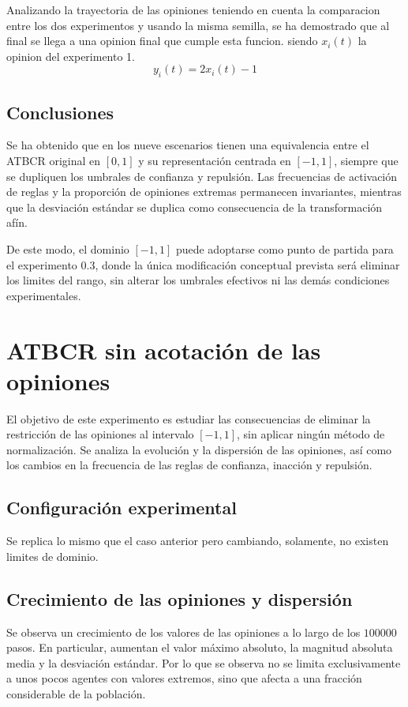 \documentclass[11pt,a4paper]{article}
\begin{document}
Analizando la trayectoria de las opiniones teniendo en cuenta la comparacion entre los dos experimentos y usando la misma semilla, se ha demostrado que al final se llega a una opinion final que cumple esta funcion. siendo $x_i(t)$ la opinion del experimento 1.
\[
y_i(t) = 2x_i(t) - 1
\]


\subsection{Conclusiones}
Se ha obtenido que en los nueve escenarios tienen una equivalencia entre el ATBCR original en $[0,1]$ y su representación centrada en $[-1,1]$, siempre que se dupliquen los umbrales de confianza y repulsión. Las frecuencias de activación de reglas y la proporción de opiniones extremas permanecen invariantes, mientras que la desviación estándar se duplica como consecuencia de la transformación afín.

De este modo, el dominio $[-1,1]$ puede adoptarse como punto de partida para el experimento 0.3, donde la única modificación conceptual prevista será eliminar los limites del rango, sin alterar los umbrales efectivos ni las demás condiciones experimentales.



\section{ATBCR sin acotación de las opiniones}

El objetivo de este experimento es estudiar las consecuencias de eliminar la restricción de las opiniones al intervalo $[-1,1]$, sin aplicar ningún método de normalización. Se analiza la evolución y la dispersión de las opiniones, así como los cambios en la frecuencia de las reglas de confianza, inacción y repulsión.


\subsection{Configuración experimental}

Se replica lo mismo que el caso anterior pero cambiando, solamente, no existen limites de dominio.



\subsection{Crecimiento de las opiniones y dispersión}
Se observa un crecimiento de los valores de las opiniones a lo largo de los $100000$ pasos. En particular, aumentan el valor máximo absoluto, la magnitud absoluta media y la desviación estándar. Por lo que se observa no se limita exclusivamente a unos pocos agentes con valores extremos, sino que afecta a una fracción considerable de la población.
\end{document}
